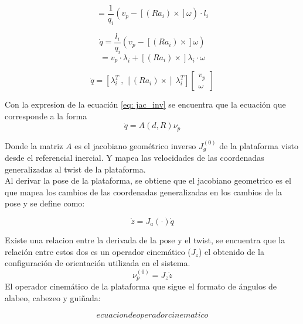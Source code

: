 \begin{equation*}
= \frac{1}{q_i}(v_p - [(Ra_i)\times]\omega)\cdot l_i
\end{equation*}

\begin{equation}
\dot{q} = \frac{l_i}{q_i}\left( v_p - [(Ra_i)\times]\omega \right) 
\end{equation}
\begin{equation*}
= v_p \cdot \lambda_i + [(Ra_i)\times]\lambda_i \cdot \omega
\end{equation*}

\begin{equation} \label{eq: jac_inv}
\dot{q} = [\lambda_i^T\ ,\ [(Ra_i)\times]\ \lambda_i^T] \begin{bmatrix}
v_p\\
\omega
\end{bmatrix}
\end{equation}

Con la expresion de la ecuación \ref{eq: jac_inv} se encuentra que la ecuación que 
corresponde a la forma
\begin{equation} \label{eq: jac_g}
\dot{q} = A(d,R) \nu_p
\end{equation}

Donde la matriz $A$ es el jacobiano geométrico inverso $J_g^{(0)}$ de la plataforma visto desde el referencial inercial. Y mapea las velocidades de las coordenadas generalizadas al twist de la plataforma.\\

Al derivar la pose de la plataforma, se obtiene que el jacobiano geometrico es el que mapea los cambios de las coordenadas generalizadas en los cambios de la pose y se define como:

\begin{equation} \label{eq: jac_a}
\dot{z} = J_a(\cdot)\dot{q}
\end{equation}

Existe una relacion entre la derivada de la pose y el twist, se encuentra que la relación entre estos dos es un operador cinemático ($J_z$) el obtenido de la configuración de orientación utilizada en el sistema.\\
\begin{equation}
\nu_p^{(0)} = J_z\dot{z}
\end{equation}
El operador cinemático de la plataforma que sigue el formato de ángulos de alabeo, cabezeo y guiñada:

\begin{equation}
ecuacion de operador cinematico
\end{equation}

